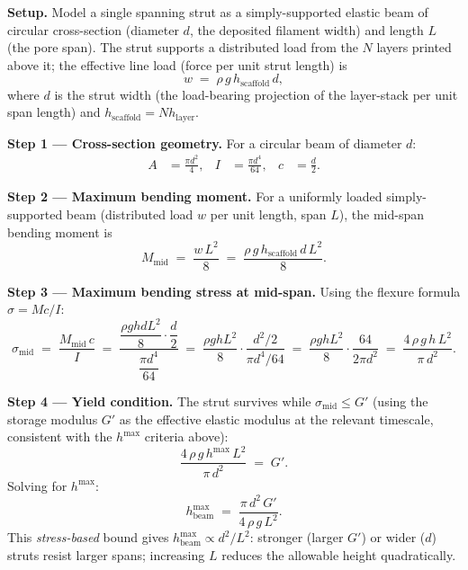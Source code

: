 \documentclass[11pt,a4paper]{article}
\begin{document}
\begin{derivationbox}[title={DERIVATION --- Beam-bending basis of the Smay criterion}]
\noindent\textbf{Setup.}
Model a single spanning strut as a simply-supported elastic beam of
circular cross-section (diameter $d$, the deposited filament width) and
length $L$ (the pore span).  The strut supports a distributed load from
the $N$ layers printed above it; the effective line load (force per unit
strut length) is
\begin{equation}
w \;=\; \rho\,g\,h_\mathrm{scaffold}\,d,
\end{equation}
where $d$ is the strut width (the load-bearing projection of the
layer-stack per unit span length) and $h_\mathrm{scaffold}=N h_\mathrm{layer}$.

\medskip\noindent\textbf{Step 1 --- Cross-section geometry.}
For a circular beam of diameter $d$:
\begin{align}
A &= \frac{\pi d^2}{4}, &
I &= \frac{\pi d^4}{64}, &
c &= \frac{d}{2}.
\end{align}

\medskip\noindent\textbf{Step 2 --- Maximum bending moment.}
For a uniformly loaded simply-supported beam (distributed load $w$ per
unit length, span $L$), the mid-span bending moment is
\begin{equation}
M_\mathrm{mid} \;=\; \frac{w\,L^2}{8}
             \;=\; \frac{\rho\,g\,h_\mathrm{scaffold}\,d\,L^2}{8}.
\end{equation}

\medskip\noindent\textbf{Step 3 --- Maximum bending stress at mid-span.}
Using the flexure formula $\sigma=Mc/I$:
\begin{equation}
\sigma_\mathrm{mid}
\;=\; \frac{M_\mathrm{mid}\,c}{I}
\;=\; \frac{\dfrac{\rho g h d L^2}{8}\cdot\dfrac{d}{2}}{\dfrac{\pi d^4}{64}}
\;=\; \frac{\rho g h L^2}{8} \cdot \frac{d^2/2}{\pi d^4/64}
\;=\; \frac{\rho g h L^2}{8} \cdot \frac{64}{2\pi d^2}
\;=\; \frac{4\,\rho\,g\,h\,L^2}{\pi\,d^2}.
\end{equation}

\medskip\noindent\textbf{Step 4 --- Yield condition.}
The strut survives while $\sigma_\mathrm{mid}\leq G'$ (using the storage
modulus $G'$ as the effective elastic modulus at the relevant timescale,
consistent with the $h^{\max}$ criteria above):
\begin{equation}
\frac{4\,\rho\,g\,h^{\max}\,L^2}{\pi\,d^2}
\;=\; G'.
\end{equation}
Solving for $h^{\max}$:
\begin{equation}
h^{\max}_\mathrm{beam}
\;=\; \frac{\pi\,d^2\,G'}{4\,\rho\,g\,L^2}.
\label{eq:hmax_beam_raw}
\end{equation}
This \emph{stress-based} bound gives $h^{\max}_\mathrm{beam}\propto d^2/L^2$:
stronger (larger $G'$) or wider ($d$) struts resist larger spans;
increasing $L$ reduces the allowable height quadratically.


\end{derivationbox}
\end{document}
